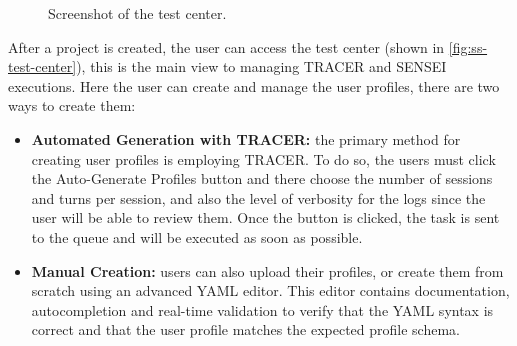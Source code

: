 \begin{figure}[!htb]
  \centering
  \caption{Screenshot of the test center.}
  \label{fig:ss-test-center}
\end{figure}

After a project is created,
the user can access the test center
(shown in \autoref{fig:ss-test-center}),
this is the main view to managing \ac{TRACER} and SENSEI executions.
Here the user can create and manage the user profiles,
there are two ways to create them:
\begin{itemize}
  \item \textbf{Automated Generation with \ac{TRACER}:}
    the primary method for creating user profiles is employing \ac{TRACER}.
    To do so, the users must click the Auto-Generate Profiles button
    and there choose the number of sessions and turns per session,
    and also the level of verbosity for the logs
    since the user will be able to review them.
    Once the button is clicked, the task is sent to the queue
    and will be executed as soon as possible.
  \item \textbf{Manual Creation:}
    users can also upload their profiles,
    or create them from scratch using an advanced YAML editor.
    This editor contains documentation, autocompletion
    and real-time validation to verify that the YAML syntax is correct
    and that the user profile matches the expected profile schema.
\end{itemize}

